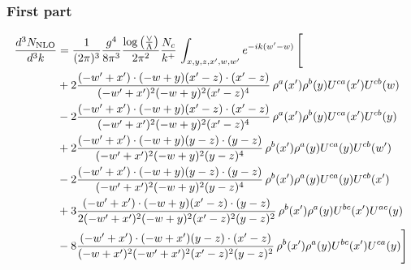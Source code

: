\documentclass[aps,prd,amsmath,amssymb,nofootinbib]{revtex4-2}
\numberwithin{equation}{section}
\begin{document}
\subsubsection{First part}
\begin{align}
    \frac{d^{3}N_{\rm NLO}}{d^{3}k} & = \frac{1}{(2\pi)^{3}}\frac{g^{4}}{8\pi^{3}}\frac{\log{\left(\frac{\vee}{\Lambda}\right)}}{2\pi^{2}} \frac{N_{c}}{k^{+}}\,\int_{x,y,z,x^{\prime},w,w^{\prime}}e^{-ik(w^{\prime}-w)}\, \Bigg[\notag \\ &  + 2 \frac{( - w' + x') \cdot ( - w + y) (x' - z) \cdot (x' - z)}{( - w' + x')^{2} ( - w + y)^{2} (x' - z)^{4}}\,\rho^{a}(x') \rho^{b}(y) U^{c a}(x') U^{c b}(w)\nonumber\\
    &- 2 \frac{( - w' + x') \cdot ( - w + y) (x' - z) \cdot (x' - z)}{( - w' + x')^{2} ( - w + y)^{2} (x' - z)^{4}}\,\rho^{a}(x') \rho^{b}(y) U^{c a}(x') U^{c b}(y)\nonumber\\
        &+ 2 \frac{( - w' + x') \cdot ( - w + y) (y - z) \cdot (y - z)}{( - w' + x')^{2} ( - w + y)^{2} (y - z)^{4}}\,\rho^{b}(x') \rho^{a}(y) U^{c a}(y) U^{c b}(w')\nonumber\\
    &-2\frac{( - w' + x') \cdot ( - w + y) (y - z) \cdot (y - z)}{( - w' + x')^{2} ( - w + y)^{2} (y - z)^{4}}\,\rho^{b}(x') \rho^{a}(y) U^{c a}(y) U^{c b}(x')\nonumber\\
    &+ 3 \frac{( - w' + x') \cdot ( - w + y) (x' - z) \cdot (y - z)}{2 ( - w' + x')^{2} ( - w + y)^{2} (x' - z)^{2} (y - z)^{2}}\,\rho^{b}(x') \rho^{a}(y) U^{b c}(x') U^{a c}(y) \nonumber\\
    &- 8 \frac{( - w' + x') \cdot ( - w + x') (y - z) \cdot (x' - z)}{( - w + x')^{2} ( - w' + x')^{2} (x' - z)^{2} (y - z)^{2}}\,\rho^{b}(x') \rho^{a}(y) U^{b c}(x') U^{c a}(y) \Bigg]
\end{align}
\end{document}
